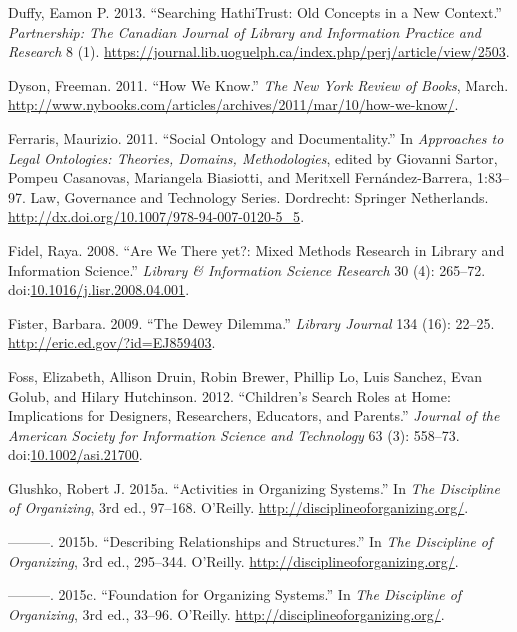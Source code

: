 \documentclass[]{article}
\begin{document}
\hypertarget{ref-duffyux5fsearchingux5f2013}{}
Duffy, Eamon P. 2013. ``Searching HathiTrust: Old Concepts in a New
Context.'' \emph{Partnership: The Canadian Journal of Library and
Information Practice and Research} 8 (1).
\url{https://journal.lib.uoguelph.ca/index.php/perj/article/view/2503}.

\hypertarget{ref-dysonux5fhowux5f2011}{}
Dyson, Freeman. 2011. ``How We Know.'' \emph{The New York Review of
Books}, March.
\url{http://www.nybooks.com/articles/archives/2011/mar/10/how-we-know/}.

\hypertarget{ref-ferrarisux5fsocialux5f2011}{}
Ferraris, Maurizio. 2011. ``Social Ontology and Documentality.'' In
\emph{Approaches to Legal Ontologies: Theories, Domains, Methodologies},
edited by Giovanni Sartor, Pompeu Casanovas, Mariangela Biasiotti, and
Meritxell Fernández-Barrera, 1:83--97. Law, Governance and Technology
Series. Dordrecht: Springer Netherlands.
\url{http://dx.doi.org/10.1007/978-94-007-0120-5_5}.

\hypertarget{ref-fidelux5fareux5f2008}{}
Fidel, Raya. 2008. ``Are We There yet?: Mixed Methods Research in
Library and Information Science.'' \emph{Library \& Information Science
Research} 30 (4): 265--72.
doi:\href{https://doi.org/10.1016/j.lisr.2008.04.001}{10.1016/j.lisr.2008.04.001}.

\hypertarget{ref-fisterux5fdeweyux5f2009}{}
Fister, Barbara. 2009. ``The Dewey Dilemma.'' \emph{Library Journal} 134
(16): 22--25. \url{http://eric.ed.gov/?id=EJ859403}.

\hypertarget{ref-fossux5fchildrensux5f2012}{}
Foss, Elizabeth, Allison Druin, Robin Brewer, Phillip Lo, Luis Sanchez,
Evan Golub, and Hilary Hutchinson. 2012. ``Children's Search Roles at
Home: Implications for Designers, Researchers, Educators, and Parents.''
\emph{Journal of the American Society for Information Science and
Technology} 63 (3): 558--73.
doi:\href{https://doi.org/10.1002/asi.21700}{10.1002/asi.21700}.

\hypertarget{ref-glushkoux5factivitiesux5f2015}{}
Glushko, Robert J. 2015a. ``Activities in Organizing Systems.'' In
\emph{The Discipline of Organizing}, 3rd ed., 97--168. O'Reilly.
\url{http://disciplineoforganizing.org/}.

\hypertarget{ref-glushkoux5fdescribingux5f2015}{}
---------. 2015b. ``Describing Relationships and Structures.'' In
\emph{The Discipline of Organizing}, 3rd ed., 295--344. O'Reilly.
\url{http://disciplineoforganizing.org/}.

\hypertarget{ref-glushkoux5ffoundationux5f2015}{}
---------. 2015c. ``Foundation for Organizing Systems.'' In \emph{The
Discipline of Organizing}, 3rd ed., 33--96. O'Reilly.
\url{http://disciplineoforganizing.org/}.
\end{document}
